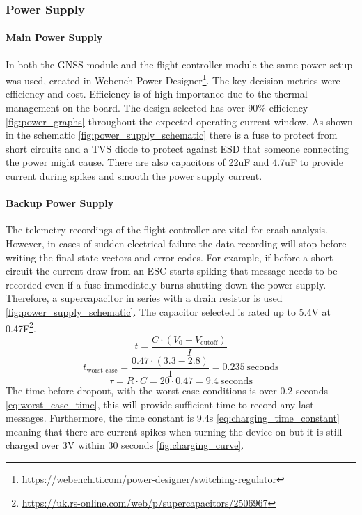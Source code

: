 \subsubsection{Power Supply}\label{sub_sub_section:tgt_power_supply}

\paragraph{Main Power Supply}
In both the GNSS module and the flight controller module the same power setup was used, created in Webench Power Designer\footnote{\url{https://webench.ti.com/power-designer/switching-regulator}}. The key decision metrics were efficiency and cost.  Efficiency is of high importance due to the thermal management on the board. The design selected has over 90\% efficiency \ref{fig:power_graphs} throughout the expected operating current window. As shown in the schematic \ref{fig:power_supply_schematic} there is a fuse to protect from short circuits and a \gls{TVS} diode to protect against \gls{ESD} that someone connecting the power might cause. There are also capacitors of 22uF and 4.7uF to provide current during spikes and smooth the power supply current.

\paragraph{Backup Power Supply}
The telemetry recordings of the flight controller are vital for crash analysis. However, in cases of sudden electrical failure the data recording will stop before writing the final state vectors and error codes. For example, if before a short circuit the current draw from an \gls{ESC} starts spiking that message needs to be recorded even if a fuse immediately burns shutting down the power supply. Therefore, a supercapacitor in series with a drain resistor is used \ref{fig:power_supply_schematic}. The capacitor selected is rated up to 5.4V at 0.47F\footnote{\url{https://uk.rs-online.com/web/p/supercapacitors/2506967}}. 
\begin{equation}
t = \frac{C \cdot (V_0 - V_{\text{cutoff}})}{I}
\label{eq:discharge_time}
\end{equation}
\begin{equation}
t_{\text{worst-case}} = \frac{0.47 \cdot (3.3 - 2.8)}{1} = 0.235\ \text{seconds}
\label{eq:worst_case_time}
\end{equation}
\begin{equation}
\tau = R \cdot C = 20 \cdot 0.47 = 9.4\ \text{seconds}
\label{eq:charging_time_constant}
\end{equation}
The time before dropout, with the worst case conditions is over 0.2 seconds \ref{eq:worst_case_time}, this will provide sufficient time to record any last messages. Furthermore, the time constant is 9.4s \ref{eq:charging_time_constant} meaning that there are current spikes when turning the device on but it is still charged over 3V within 30 seconds \ref{fig:charging_curve}.

